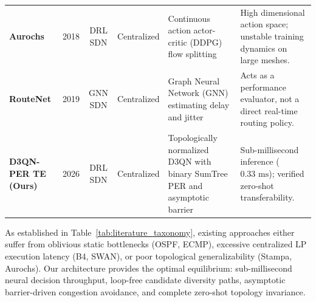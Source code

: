 \begin{table}[htbp]
\begin{tabularx}{\textwidth}{l c c c p{4.2cm} X}
\addlinespace
\textbf{Aurochs} \cite{chen2018aurochs} & 2018 & DRL SDN & Centralized & Continuous action actor-critic (DDPG) flow splitting & High dimensional action space; unstable training dynamics on large meshes. \\
\addlinespace
\textbf{RouteNet} \cite{rusek2019routenet} & 2019 & GNN SDN & Centralized & Graph Neural Network (GNN) estimating delay and jitter & Acts as a performance evaluator, not a direct real-time routing policy. \\
\addlinespace
\textbf{D3QN-PER TE (Ours)} & 2026 & DRL SDN & Centralized & Topologically normalized D3QN with binary SumTree PER and asymptotic barrier & Sub-millisecond inference ($0.33\text{ ms}$); verified zero-shot transferability. \\
\bottomrule
\end{tabularx}
\end{table}

As established in Table~\ref{tab:literature_taxonomy}, existing approaches either suffer from oblivious static bottlenecks (OSPF, ECMP), excessive centralized LP execution latency (B4, SWAN), or poor topological generalizability (Stampa, Aurochs). Our architecture provides the optimal equilibrium: sub-millisecond neural decision throughput, loop-free candidate diversity paths, asymptotic barrier-driven congestion avoidance, and complete zero-shot topology invariance.
